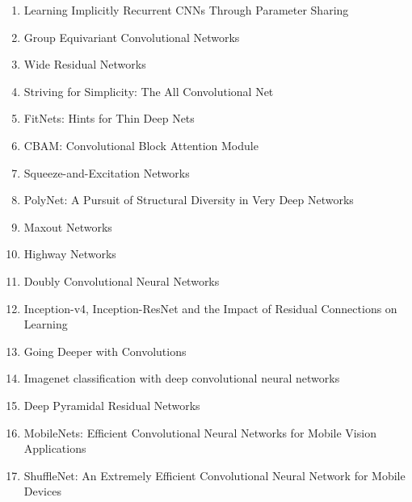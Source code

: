 \documentclass[acmlarge]{acmart}
\begin{document}
\begin{enumerate}
	\item Learning Implicitly Recurrent CNNs Through Parameter Sharing \cite{savarese2019learning} 

	\item Group Equivariant Convolutional Networks \cite{cohen2016group} 

	\item Wide Residual Networks \cite{zagoruyko2016wide} 

	\item Striving for Simplicity: The All Convolutional Net \cite{springenberg2014striving} 

	\item FitNets: Hints for Thin Deep Nets \cite{romero2014fitnets} 

	\item CBAM: Convolutional Block Attention Module \cite{woo2018cbam} 

	\item Squeeze-and-Excitation Networks \cite{hu2017squeezeandexcitation} 

	\item PolyNet: A Pursuit of Structural Diversity in Very Deep Networks \cite{zhang2016polynet} 

	\item Maxout Networks \cite{goodfellow2013maxout} 

	\item Highway Networks \cite{srivastava2015highway} 

	\item Doubly Convolutional Neural Networks \cite{zhai2016doubly} 

	\item Inception-v4, Inception-ResNet and the Impact of Residual Connections on Learning \cite{szegedy2016inceptionv4} 

	\item Going Deeper with Convolutions \cite{szegedy2014going} 

	\item Imagenet classification with deep convolutional neural networks \cite{Krizhevsky_imagenetclassification} 

	\item Deep Pyramidal Residual Networks \cite{han2016deep} 

	\item MobileNets: Efficient Convolutional Neural Networks for Mobile Vision Applications \cite{howard2017mobilenets} 

	\item ShuffleNet: An Extremely Efficient Convolutional Neural Network for Mobile Devices \cite{zhang2017shufflenet} 


\end{enumerate}
\end{document}

